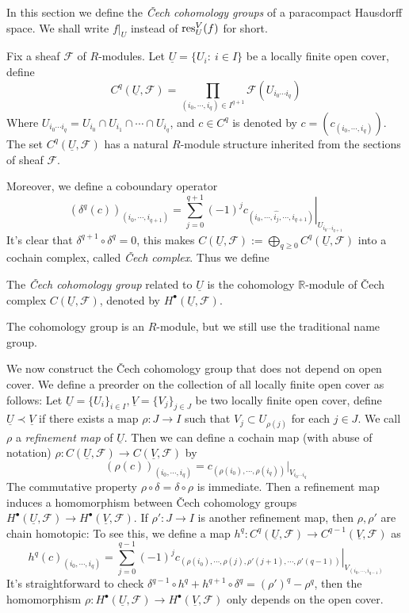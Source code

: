 In this section we define the \emph{\v{C}ech cohomology groups} of a paracompact Hausdorff space.
We shall write $f|_U$ instead of $\operatorname{res}^V_U(f)$ for short.

Fix a sheaf $\mathcal{F}$ of $R$-modules.
Let $\underline{U}=\{U_i:\ i\in I\}$ be a locally finite open cover, define
\[C^q(\underline{U},\mathcal{F})=\prod_{(i_0,\cdots,i_q)\in I^{q+1}}\mathcal{F}(U_{i_0\cdots i_q})\]
Where $U_{i_0\cdots i_q}=U_{i_0}\cap U_{i_1}\cap\cdots\cap U_{i_q}$, and $c\in C^q$ is denoted by $c=\left(c_{(i_0,\cdots,i_q)}\right)$.
The set $C^q(\underline{U},\mathcal{F})$ has a natural $R$-module structure inherited from the sections of sheaf $\mathcal{F}$.

Moreover, we define a coboundary operator
\[(\delta^q(c))_{(i_0,\cdots,i_{q+1})}=\sum_{j=0}^{q+1}(-1)^j\left.c_{(i_0,\cdots,\widehat{i_j},\cdots,i_{q+1})}\right|_{U_{i_0\cdots i_{q+1}}}\]
It's clear that $\delta^{q+1}\circ\delta^q=0$, this makes $C(\underline{U},\mathcal{F}):=\bigoplus_{q\geq 0}C^q(\underline{U},\mathcal{F})$ into a cochain complex, called \emph{\v{C}ech complex}.
Thus we define

\begin{defn}
    The \emph{\v{C}ech cohomology group} related to $\underline{U}$ is the cohomology $\mathbb{R}$-module of \v{C}ech complex $C(\underline{U},\mathcal{F})$, denoted by $H^\bullet(\underline{U},\mathcal{F})$.
\end{defn}

The cohomology group is an $R$-module, but we still use the traditional name group.

We now construct the \v{C}ech cohomology group that does not depend on open cover.
We define a preorder on the collection of all locally finite open cover as follows:
Let $\underline{U}=\{U_i\}_{i\in I},\underline{V}=\{V_j\}_{j\in J}$ be two locally finite open cover, define $\underline{U}\prec\underline{V}$ if there exists a map $\rho:J\to I$ such that $V_j\subset U_{\rho(j)}$ for each $j\in J$.
We call $\rho$ a \emph{refinement map} of $\underline{U}$.
Then we can define a cochain map (with abuse of notation) $\rho:C(\underline{U},\mathcal{F})\to C(\underline{V},\mathcal{F})$ by
\[(\rho(c))_{(i_0,\cdots,i_q)}=c_{(\rho(i_0),\cdots,\rho(i_q))}|_{V_{i_0\cdots i_q}}\]
The commutative property $\rho\circ\delta=\delta\circ\rho$ is immediate.
Then a refinement map induces a homomorphism between \v{C}ech cohomology groups $H^\bullet(\underline{U},\mathcal{F})\to H^\bullet(\underline{V},\mathcal{F})$.
If $\rho':J\to I$ is another refinement map, then $\rho,\rho'$ are chain homotopic:
To see this, we define a map $h^q:C^q(\underline{U},\mathcal{F})\to C^{q-1}(\underline{V},\mathcal{F})$ as
\[h^q(c)_{(i_0,\cdots,i_q)}=\sum_{j=0}^{q-1}(-1)^j\left.c_{(\rho(i_0),\cdots,\rho(j),\rho'(j+1),\cdots,\rho'(q-1))}\right|_{V_{(i_0,\cdots,i_{q-1})}}\]
It's straightforward to check $\delta^{q-1}\circ h^q+h^{q+1}\circ\delta^q=(\rho')^q-\rho^q$, then the homomorphism $\rho:H^\bullet(\underline{U},\mathcal{F})\to H^\bullet(\underline{V},\mathcal{F})$ only depends on the open cover.

